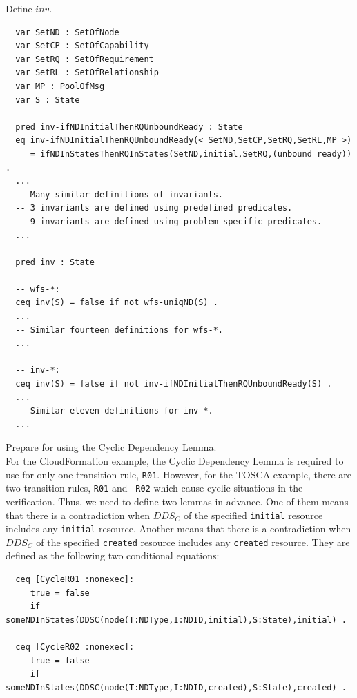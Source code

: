 \documentclass[12pt]{report}
\begin{document}
 Define $inv$. 
\small
\begin{verbatim}
  var SetND : SetOfNode
  var SetCP : SetOfCapability
  var SetRQ : SetOfRequirement
  var SetRL : SetOfRelationship
  var MP : PoolOfMsg
  var S : State

  pred inv-ifNDInitialThenRQUnboundReady : State
  eq inv-ifNDInitialThenRQUnboundReady(< SetND,SetCP,SetRQ,SetRL,MP >)
     = ifNDInStatesThenRQInStates(SetND,initial,SetRQ,(unbound ready)) .
  ...
  -- Many similar definitions of invariants.
  -- 3 invariants are defined using predefined predicates.
  -- 9 invariants are defined using problem specific predicates.
  ...

  pred inv : State

  -- wfs-*:
  ceq inv(S) = false if not wfs-uniqND(S) .
  ...
  -- Similar fourteen definitions for wfs-*.  
  ...

  -- inv-*:
  ceq inv(S) = false if not inv-ifNDInitialThenRQUnboundReady(S) .
  ...
  -- Similar eleven definitions for inv-*.  
  ...

\end{verbatim}
\normalsize

 Prepare for using the Cyclic Dependency
Lemma. \\
For the CloudFormation example, the Cyclic Dependency Lemma is
required to use for only one transition rule, {\tt R01}. However, for
the TOSCA example, there are two transition rules, {\tt R01} and {\tt
  R02} which cause cyclic situations in the verification. Thus, we
need to define two lemmas in advance.  One of them means that there is
a contradiction when $DDS_C$ of the specified {\tt initial} resource
includes any {\tt initial} resource.  Another means that there is a
contradiction when $DDS_C$ of the specified {\tt created} resource
includes any {\tt created} resource.  They are defined as the
following two conditional equations:
\small
\begin{verbatim}
  ceq [CycleR01 :nonexec]: 
     true = false
     if someNDInStates(DDSC(node(T:NDType,I:NDID,initial),S:State),initial) .

  ceq [CycleR02 :nonexec]: 
     true = false
     if someNDInStates(DDSC(node(T:NDType,I:NDID,created),S:State),created) .

\end{verbatim}
\normalsize
\end{document}
